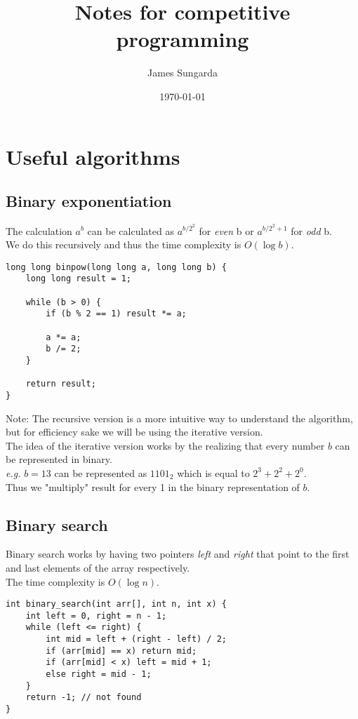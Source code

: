 \documentclass{notes}
\begin{document}
\title{Notes for competitive programming}
\author{James Sungarda}
\date{\today}
\maketitle

\section{Useful algorithms}

\subsection{Binary exponentiation}
The calculation \(a^b\) can be calculated as \(a^{{b/2}^2}\) for \emph{even} b or \(a^{{b/2}^2 + 1}\) for \emph{odd} b. \\
We do this recursively and thus the time complexity is \(O(\log b)\).

\begin{verbatim}
long long binpow(long long a, long long b) {
    long long result = 1;

    while (b > 0) {
        if (b % 2 == 1) result *= a;

        a *= a;
        b /= 2;
    }

    return result;
}
\end{verbatim}

Note: The recursive version is a more intuitive way to understand the algorithm, but for efficiency sake we will be using the iterative version.\\
The idea of the iterative version works by the realizing that every number \(b\) can be represented in binary. \\
\textit{e.g.} \(b = 13\) can be represented as \(1101_2\) which is equal to \(2^3 + 2^2 + 2^0\). \\
Thus we "multiply" result for every 1 in the binary representation of \(b\).

\subsection{Binary search}
Binary search works by having two pointers \emph{left} and \emph{right} that point to the first and last elements of the array respectively. \\
The time complexity is \(O(\log n)\).
\begin{verbatim}
int binary_search(int arr[], int n, int x) {
    int left = 0, right = n - 1;
    while (left <= right) {
        int mid = left + (right - left) / 2;
        if (arr[mid] == x) return mid;
        if (arr[mid] < x) left = mid + 1;
        else right = mid - 1;
    }
    return -1; // not found
}
\end{verbatim}
\end{document}
